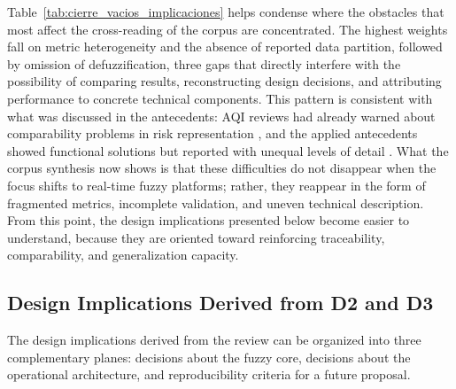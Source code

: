 

Table~\ref{tab:cierre_vacios_implicaciones} helps condense where the obstacles that most affect the cross-reading of the corpus are concentrated. The highest weights fall on metric heterogeneity and the absence of reported data partition, followed by omission of defuzzification, three gaps that directly interfere with the possibility of comparing results, reconstructing design decisions, and attributing performance to concrete technical components. This pattern is consistent with what was discussed in the antecedents: AQI reviews had already warned about comparability problems in risk representation \cite{ART01,ART02}, and the applied antecedents showed functional solutions but reported with unequal levels of detail \cite{ART04,ART05,ART06,ART07,ART08}. What the corpus synthesis now shows is that these difficulties do not disappear when the focus shifts to real-time fuzzy platforms; rather, they reappear in the form of fragmented metrics, incomplete validation, and uneven technical description. From this point, the design implications presented below become easier to understand, because they are oriented toward reinforcing traceability, comparability, and generalization capacity.

\subsection{Design Implications Derived from D2 and D3}
The design implications derived from the review can be organized into three complementary planes: decisions about the fuzzy core, decisions about the operational architecture, and reproducibility criteria for a future proposal.

